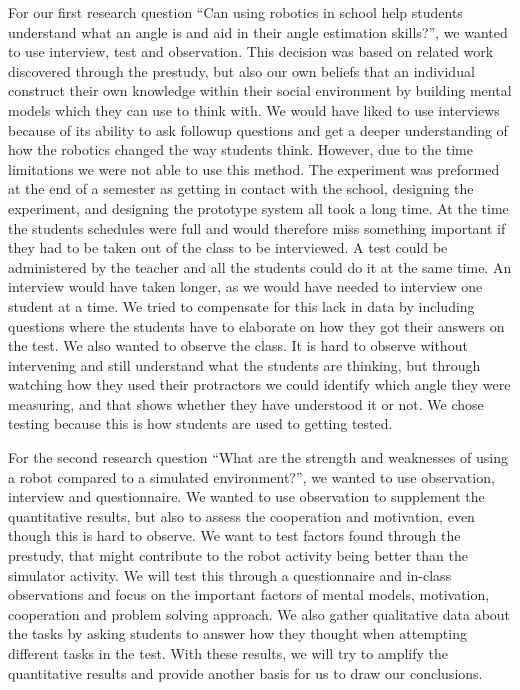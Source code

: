 \bigskip\noindent
For our first research question ``Can using robotics in school help students understand what an angle is and aid in their angle estimation skills?'', we wanted to use interview, test and observation. This decision was based on related work discovered through the prestudy, but also our own beliefs that an individual construct their own knowledge within their social environment by building mental models which they can use to think with. We would have liked to use interviews because of its ability to ask followup questions and get a deeper understanding of how the robotics changed the way students think. 
However, due to the time limitations we were not able to use this method. 
The experiment was preformed at the end of a semester as getting in contact with the school, designing the experiment, and designing the prototype system all took a long time.
At the time the students schedules were full and would therefore miss something important if they had to be taken out of the class to be interviewed. A test could be administered by the teacher and all the students could do it at the same time. An interview would have taken longer, as we would have needed to interview one student at a time. We tried to compensate for this lack in data by including questions where the students have to elaborate on how they got their answers on the test. We also wanted to observe the class. It is hard to observe without intervening and still understand what the students are thinking, but through watching how they used their protractors we could identify which angle they were measuring, and that shows whether they have understood it or not. We chose testing because this is how students are used to getting tested.

\bigskip\noindent
For the second research question ``What are the strength and weaknesses of using a robot compared to a simulated environment?'',  we wanted to use observation, interview and questionnaire. We wanted to use observation to supplement the quantitative results, but also to assess the cooperation and motivation, even though this is hard to observe. We want to test factors found through the prestudy, that might contribute to the robot activity being better than the simulator activity. We will test this through a questionnaire and in-class observations and focus on the important factors of mental models, motivation, cooperation and problem solving approach. We also gather qualitative data about the tasks by asking students to answer how they thought when attempting different tasks in the test. With these results, we will try to amplify the quantitative results and provide another basis for us to draw our conclusions. 


